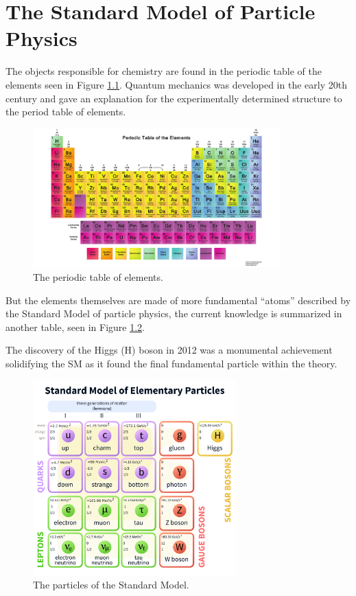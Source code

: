 \chapter{The Standard Model of Particle Physics}
\label{chap:sm}

The objects responsible for chemistry are found in the periodic table of the elements seen in Figure \ref{fig:periodictable}. Quantum mechanics was developed in the early 20th century and gave an explanation for the experimentally determined structure to the period table of elements.
\begin{figure}[htbp]
\centering
\includegraphics[width=0.85\textwidth]{figs/PeriodicTable.pdf}
\caption{The periodic table of elements.}
\label{fig:periodictable}
\end{figure}

But the elements themselves are made of more fundamental ``atoms'' described by the Standard Model of particle physics, the current knowledge is summarized in another table, seen in Figure \ref{fig:sm}.

The discovery of the Higgs (H) boson in 2012 was a monumental achievement solidifying the SM as it found the final fundamental particle within the theory.\cite{201230} 

\begin{figure}[htbp]
\centering
\includegraphics[width=0.7\textwidth]{figs/StandardModelofElementaryParticles.pdf}
\caption{The particles of the Standard Model.}
\label{fig:sm}
\end{figure}

